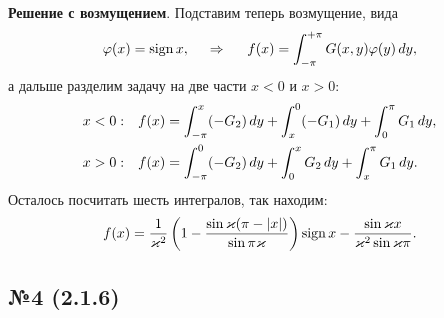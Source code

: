 \textbf{Решение с возмущением}. Подставим теперь возмущение, вида 
\begin{equation*}
    \varphi(x)  = \mathop{\mathrm{sign}}\nolimits x,
    \hspace{0.5cm} \Rightarrow \hspace{0.5cm}
    f(x) = 
    \int_{-\pi}^{+\pi} G(x, y) \varphi(y) \, d y,
\end{equation*}
а дальше разделим задачу на две части $x<0$ и $x > 0$:
\begin{align*}
    &x<0:
    &f(x) &= \int_{-\pi}^{x} (-G_2) \, d y  + \int_{x}^{0} (-G_1) \, d y + \int_{0}^{\pi} G_1 \, d y, \\
    &x >0:
    &f(x) &= \int_{-\pi}^{0} (-G_2) \, d y + \int_{0}^{x}  G_2 \, d y + \int_{x}^{\pi} G_1 \, d y.
\end{align*}
Осталось посчитать шесть интегралов, так находим:
\begin{equation*}
    f(x) = \frac{1}{\varkappa^2} \left(
         1 - \frac{\sin \varkappa (\pi - |x|) }{\sin  \pi \varkappa}
    \right) \mathop{\mathrm{sign}}\nolimits x - 
    \frac{\sin \varkappa x}{\varkappa^2 \sin \varkappa \pi}.
\end{equation*}



\subsection*{№4 (2.1.6)}




